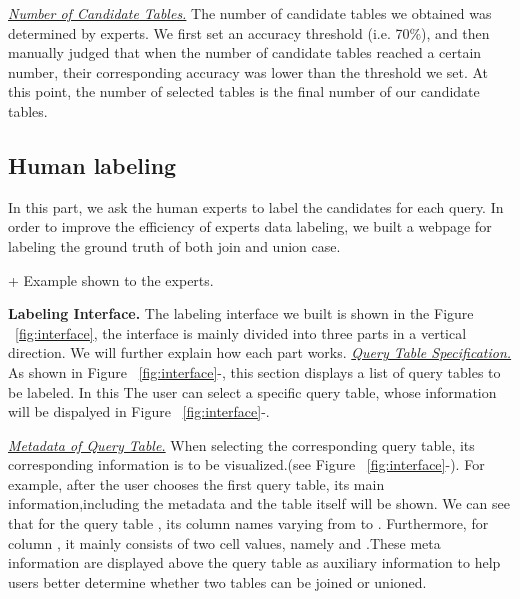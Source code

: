 \noindent  \underline{\textit{Number of Candidate Tables.}}  The number of candidate tables we obtained was determined by experts. We first set an accuracy threshold (i.e. 70\%), and then manually judged that when the number of candidate tables reached a certain number, their corresponding accuracy was lower than the threshold we set. At this point, the number of selected tables is the final number of our candidate tables.


\subsection{Human labeling}
In this part, we ask the human experts to label the candidates for each query. In order to improve the efficiency of experts data labeling, we built a webpage for labeling the ground truth of both join and union case.

+ Example shown to the experts.

\noindent \textbf{Labeling Interface.} 
The labeling interface we built is shown in the Figure ~\ref{fig:interface}, the interface is mainly divided into three parts in a vertical direction. We will further explain how each part works.
\noindent \underline{\textit{Query Table Specification.}}  
As shown in Figure ~\ref{fig:interface}-, this section displays a list of query tables to be labeled.  In this The user can select a specific query table, whose information will be dispalyed in Figure ~\ref{fig:interface}-.

\noindent \underline{\textit{Metadata of Query Table.}}  When selecting the corresponding query table,  its corresponding information is to be visualized.(see Figure ~\ref{fig:interface}-). For example, after the user chooses the first query table, its main information,including the metadata and the table itself  will be shown. We can see that for the query table , its column names varying from  to . Furthermore, for column , it mainly consists of two cell values, namely  and .These meta information are displayed above the query table as auxiliary information to help users better determine whether two tables can be joined or unioned.

